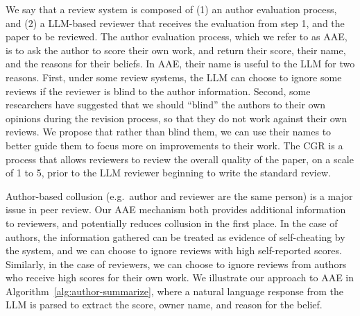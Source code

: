 \begin{definition} We say that a review system is composed of (1) an author evaluation process, and (2) a LLM-based reviewer that receives the evaluation from step 1, and the paper to be reviewed. The author evaluation process, which we refer to as AAE, is to ask the author to score their own work, and return their score, their name, and the reasons for their beliefs. In AAE, their name is useful to the LLM for two reasons. First, under some review systems, the LLM can choose to ignore some reviews if the reviewer is blind to the author information. Second, some researchers have suggested that we should ``blind'' the authors to their own opinions during the revision process, so that they do not work against their own reviews. We propose that rather than blind them, we can use their names to better guide them to focus more on improvements to their work. 
The CGR is a process that allows reviewers to review the overall quality of the paper, on a scale of 1 to 5, prior to the LLM reviewer beginning to write the standard review. 
\end{definition}
Author-based collusion (e.g.\ author and reviewer are the same person) is a major issue in peer review. Our AAE mechanism both provides additional information to reviewers, and potentially reduces collusion in the first place. In the case of authors, the information gathered can be treated as evidence of self-cheating by the system, and we can choose to ignore reviews with high self-reported scores. Similarly, in the case of reviewers, we can choose to ignore reviews from authors who receive high scores for their own work. We illustrate our approach to AAE in Algorithm~\ref{alg:author-summarize}, where a natural language response from the LLM is parsed to extract the score, owner name, and reason for the belief. 

